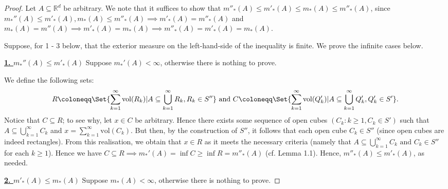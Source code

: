 \begin{proof} Let \( A \subseteq \mathbb{R}^{d}  \) be arbitrary. We note that it suffices to show that \( m''_*(A) \leq m'_*(A) \leq m_*(A) \leq m''_*(A)\), since \( m_*''(A) \leq m'_*(A), m_*(A) \leq m''_*(A) \implies m'_*(A) = m''_*(A) \) and \( m_*(A) = m''(A) \implies m'_*(A) = m_*(A) \implies m''_*(A) = m'_*(A) = m_*(A). \)

Suppose, for 1 - 3 below, that the exterior measure on the left-hand-side of the inequality is finite. We prove the infinite cases below.

\noindent \underline{\textbf{1. \( m_*''(A) \leq m'_*(A) \)}} Suppose \( m_*'(A) < \infty  \), otherwise there is nothing to prove.

\noindent We define the following sets:
\[ R \coloneqq \Set{\sum_{k = 1}^{\infty} \mbox{vol}(R_k) | A \subseteq \bigcup_{k=1}^{\infty} R_k, R_k \in S''  } \mbox{ and } C \coloneqq  \Set{\sum_{k = 1}^{\infty} \mbox{vol}(Q'_k) | A \subseteq \bigcup_{k=1}^{\infty} Q'_k, Q'_k \in S'  }. \] Notice that \( C \subseteq R \); to see why, let \( x \in C \) be arbitrary. Hence there exists some sequence of open cubes \( (C_k : k \geq 1, C_k \in S') \) such that \( A \subseteq \bigcup_{k=1}^{\infty} C_k \) and \( x = \sum_{k=1}^{\infty} \mbox{vol}(C_k)  \). But then, by the construction of \( S'' \), it follows that each open cube \( C_k \in S'' \) (since open cubes are indeed rectangles). From this realisation, we obtain that \( x \in R \) as it meets the necessary criteria (namely that \( A \subseteq \bigcup_{k=1}^{\infty} C_k \mbox{ and } C_k \in S''  \) for each \( k \geq 1 \)). Hence we have \( C \subseteq R \implies m_*'(A) =  \inf C \geq \inf R = m''_*(A) \) (cf. Lemma 1.1). Hence, \( m''_*(A) \leq m'_*(A) \), as needed.

\noindent \underline{\textbf{2. \( m'_*(A) \leq m_*(A) \)}} Suppose \( m_*(A) < \infty  \), otherwise there is nothing to prove.



\end{proof}
